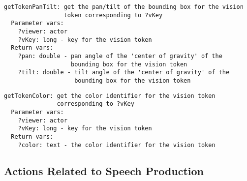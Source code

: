 \documentclass[11pt,letterpaper]{article}
\begin{document}
\begin{Verbatim}
getTokenPanTilt: get the pan/tilt of the bounding box for the vision
                 token corresponding to ?vKey
  Parameter vars:
    ?viewer: actor
    ?vKey: long - key for the vision token
  Return vars:
    ?pan: double - pan angle of the 'center of gravity' of the
                   bounding box for the vision token
    ?tilt: double - tilt angle of the 'center of gravity' of the
                    bounding box for the vision token
\end{Verbatim}

\begin{Verbatim}
getTokenColor: get the color identifier for the vision token
               corresponding to ?vKey
  Parameter vars:
    ?viewer: actor
    ?vKey: long - key for the vision token
  Return vars:
    ?color: text - the color identifier for the vision token
\end{Verbatim}

\subsection{Actions Related to Speech Production}

\begin{comment}
\paragraph{\tt sayTextNow} Speak the string.

\paragraph{\tt changeMood} Modulate the voice's ``mood.''

\paragraph{\tt changeSpeed} Modulate the voice's speed.

\paragraph{\tt stopUtterance} Interrupt the current utterance.

% 
% 
\end{comment}
\end{document}

